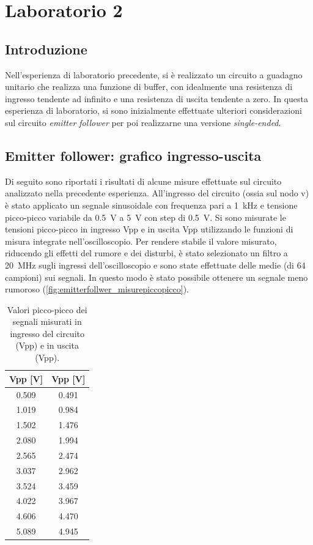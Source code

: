 \chapter{Laboratorio 2}
\section{Introduzione}
Nell'esperienza di laboratorio precedente, si è realizzato un circuito a guadagno unitario che realizza una funzione di buffer, con idealmente una resistenza di ingresso tendente ad infinito e una resistenza di uscita tendente a zero. In questa esperienza di laboratorio, si sono inizialmente effettuate ulteriori considerazioni sul circuito \textit{emitter follower} per poi realizzarne una versione \textit{single-ended}.

\section{Emitter follower: grafico ingresso-uscita}
Di seguito sono riportati i risultati di alcune misure effettuate sul circuito analizzato nella precedente esperienza. All'ingresso del circuito (ossia sul nodo v) è stato applicato un segnale sinusoidale con frequenza pari a \SI{1}{\kilo\hertz} e tensione picco-picco variabile da \SI{0.5}{\volt} a \SI{5}{\volt} con step di \SI{0.5}{\volt}. Si sono misurate le tensioni picco-picco in ingresso Vpp e in uscita Vpp utilizzando le funzioni di misura integrate nell'oscilloscopio. Per rendere stabile il valore misurato, riducendo gli effetti del rumore e dei disturbi, è stato selezionato un filtro a \SI{20}{\mega\hertz} sugli ingressi dell'oscilloscopio e sono state effettuate delle medie (di 64 campioni) sui segnali. In questo modo è stato possibile ottenere un segnale meno rumoroso (\Fig\ref{fig:emitterfollwer_misurepiccopicco}).
\begin{table}[h!]
	\centering
	\begin{tabular}{c|c}
		\hline
		Vpp\sub{i} [V] & Vpp\sub{o} [V]\\ \hline
		0.509 & 0.491 \\ \hline
		1.019 & 0.984 \\ \hline
		1.502 & 1.476 \\ \hline
		2.080 & 1.994 \\ \hline
		2.565 & 2.474 \\ \hline
		3.037 & 2.962 \\ \hline
		3.524 & 3.459 \\ \hline
		4.022 & 3.967 \\ \hline
		4.606 & 4.470 \\ \hline
		5.089 & 4.945 \\ \hline
	\end{tabular}
	\caption{Valori picco-picco dei segnali misurati in ingresso del circuito (Vpp) e in uscita (Vpp).}
	\label{tab:misurepiccopicco}
\end{table}
